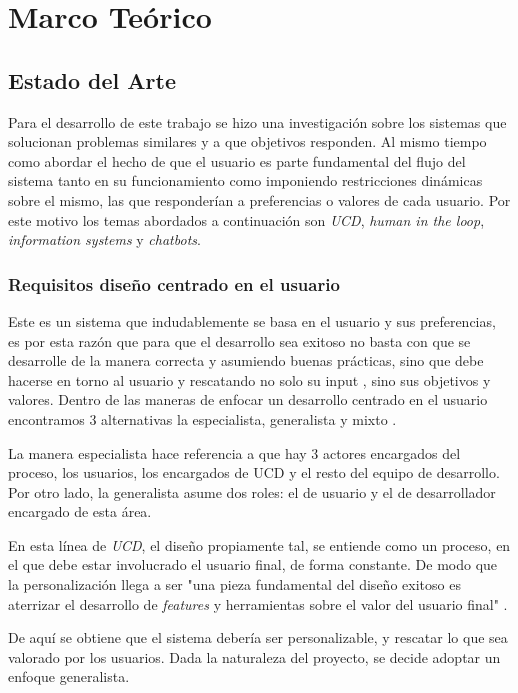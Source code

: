 \chapter{Marco Teórico}\label{mt}
\section{Estado del Arte}
    \par Para el desarrollo de este trabajo se hizo una investigación sobre los sistemas que solucionan problemas similares y a que objetivos responden. Al mismo tiempo como abordar el hecho de que el usuario es parte fundamental del flujo del sistema tanto en su funcionamiento como imponiendo restricciones dinámicas sobre el mismo, las que responderían a preferencias o valores de cada usuario. Por este motivo los temas abordados a continuación son \textit{\acrfull{UCD}}, \textit{human in the loop}, \textit{information systems} y \textit{chatbots}.
    
    \subsection{Requisitos diseño centrado en el usuario}
    \par Este es un sistema que indudablemente se basa en el usuario y sus preferencias, es por esta razón que para que el desarrollo sea exitoso no basta con que se desarrolle de la manera correcta y asumiendo buenas prácticas, sino que debe hacerse en torno al usuario y rescatando no solo su input \cite{Karat1997}, sino sus objetivos y valores. Dentro de las maneras de enfocar un desarrollo centrado en el usuario encontramos 3 alternativas la especialista, generalista y mixto \cite{Fox2008}.
    \par La manera especialista hace referencia a que hay 3 actores encargados del proceso, los usuarios, los encargados de \acrshort{UCD} y el resto del equipo de desarrollo. Por otro lado, la generalista asume dos roles: el de usuario y el de desarrollador encargado de esta área.
    \par En esta línea de \textit{\acrlong{UCD}}, el diseño propiamente tal, se entiende como un proceso, en el que debe estar involucrado el usuario final, de forma constante.
    De modo que la personalización llega a ser "una pieza fundamental del diseño exitoso es aterrizar el desarrollo de \textit{features} y herramientas sobre el valor del usuario final" \cite{Kramer2000}.
    \par De aquí se obtiene que el sistema debería ser personalizable, y rescatar lo que sea valorado por los usuarios. Dada la naturaleza del proyecto, se decide adoptar un enfoque generalista.
    
